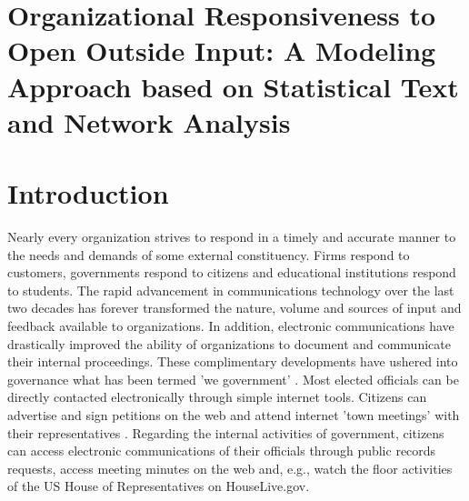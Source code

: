

\section*{\Large Organizational Responsiveness to Open Outside Input:  A Modeling Approach based on Statistical Text and Network Analysis}



\section{Introduction}

Nearly every organization strives to respond in a timely and accurate manner to the needs and demands of some external constituency. Firms respond to customers, governments respond to citizens and educational institutions respond to students. The rapid advancement in communications technology over the last two decades has forever transformed the nature, volume and sources of input and feedback available to organizations. In addition, electronic communications have drastically improved the ability of organizations to document and communicate their internal proceedings. These complimentary developments have ushered into governance what has been termed 'we government' \cite{Linders2012}. Most elected officials can be directly contacted electronically through simple internet tools. Citizens can advertise and sign petitions on the web and attend internet 'town meetings' with their representatives \cite{Kavanaugh2010} . Regarding the internal activities of government, citizens can access electronic communications of their officials through public records requests, access meeting minutes on the web and, e.g., watch the floor activities of the US House of Representatives on HouseLive.gov. 

